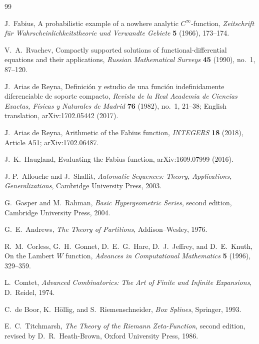 \documentclass[11pt,oneside]{article}
\numberwithin{equation}{section}
\theoremstyle{definition}
\theoremstyle{remark}
\begin{document}
\begin{thebibliography}{99}

J.~Fabius,
\newblock A probabilistic example of a nowhere analytic $C^\infty$-function,
\newblock \emph{Zeitschrift f\"ur Wahrscheinlichkeitstheorie und Verwandte
Gebiete} \textbf{5} (1966), 173--174.

V.~A.~Rvachev,
\newblock Compactly supported solutions of functional-differential equations and their
applications,
\newblock \emph{Russian Mathematical Surveys} \textbf{45} (1990), no.~1, 87--120.

J.~Arias de Reyna,
\newblock Definici\'on y estudio de una funci\'on indefinidamente diferenciable de soporte
compacto,
\newblock \emph{Revista de la Real Academia de Ciencias Exactas, F\'isicas y Naturales de
Madrid} \textbf{76} (1982), no.~1, 21--38;
English translation, arXiv:1702.05442 (2017).

J.~Arias de Reyna,
\newblock Arithmetic of the Fabius function,
\newblock \emph{INTEGERS} \textbf{18} (2018), Article A51;
arXiv:1702.06487.

J.~K.~Haugland,
\newblock Evaluating the Fabius function,
\newblock arXiv:1609.07999 (2016).

J.-P.~Allouche and J.~Shallit,
\newblock \emph{Automatic Sequences: Theory, Applications, Generalizations},
\newblock Cambridge University Press, 2003.

G.~Gasper and M.~Rahman,
\newblock \emph{Basic Hypergeometric Series}, second edition,
\newblock Cambridge University Press, 2004.

G.~E.~Andrews,
\newblock \emph{The Theory of Partitions},
\newblock Addison--Wesley, 1976.

R.~M.~Corless, G.~H.~Gonnet, D.~E.~G.~Hare, D.~J.~Jeffrey, and D.~E.~Knuth,
\newblock On the Lambert $W$ function,
\newblock \emph{Advances in Computational Mathematics} \textbf{5} (1996), 329--359.

L.~Comtet,
\newblock \emph{Advanced Combinatorics: The Art of Finite and Infinite Expansions},
\newblock D.~Reidel, 1974.

C.~de Boor, K.~H\"ollig, and S.~Riemenschneider,
\newblock \emph{Box Splines},
\newblock Springer, 1993.

E.~C.~Titchmarsh,
\newblock \emph{The Theory of the Riemann Zeta-Function}, second edition, revised by
D.~R.~Heath-Brown,
\newblock Oxford University Press, 1986.


\end{thebibliography}
\end{document}
